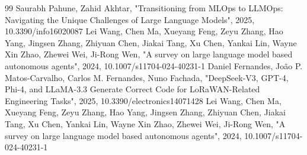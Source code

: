 \documentclass[conference]{IEEEtran}
\begin{document}
\begin{thebibliography}{99}
 Saurabh Pahune, Zahid Akhtar, "Transitioning from MLOps to LLMOps: Navigating the Unique Challenges of Large Language Models", 2025, 10.3390/info16020087
 Lei Wang, Chen Ma, Xueyang Feng, Zeyu Zhang, Hao Yang, Jingsen Zhang, Zhiyuan Chen, Jiakai Tang, Xu Chen, Yankai Lin, Wayne Xin Zhao, Zhewei Wei, Ji-Rong Wen, "A survey on large language model based autonomous agents", 2024, 10.1007/s11704-024-40231-1
 Daniel Fernandes, João P. Matos-Carvalho, Carlos M. Fernandes, Nuno Fachada, "DeepSeek-V3, GPT-4, Phi-4, and LLaMA-3.3 Generate Correct Code for LoRaWAN-Related Engineering Tasks", 2025, 10.3390/electronics14071428
 Lei Wang, Chen Ma, Xueyang Feng, Zeyu Zhang, Hao Yang, Jingsen Zhang, Zhiyuan Chen, Jiakai Tang, Xu Chen, Yankai Lin, Wayne Xin Zhao, Zhewei Wei, Ji-Rong Wen, "A survey on large language model based autonomous agents", 2024, 10.1007/s11704-024-40231-1
\end{thebibliography}
\end{document}
